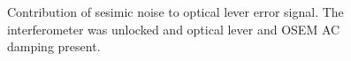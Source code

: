 \begin{figure}
\begin{centering}
\caption[]{Contribution of sesimic noise to optical lever error
  signal. The interferometer was unlocked and optical lever and OSEM
  AC damping present.}
\label{fig:}
\end{centering}
\end{figure}





